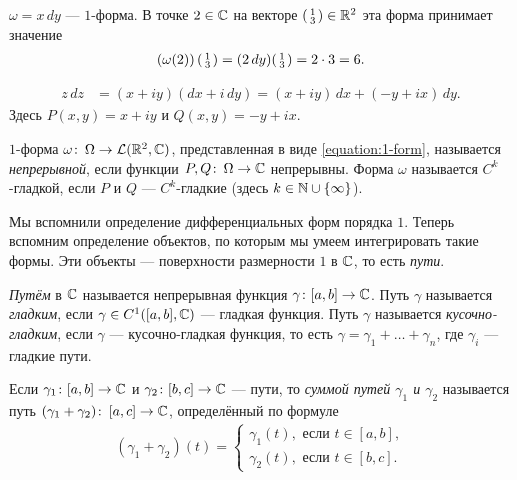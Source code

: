 \begin{exmpl*}
 $\omega = x \, dy$ --- $1$-форма. В точке $2 \in \mathbb{C}$ на векторе $ \begin{psmallmatrix}
  1 \\ 3
 \end{psmallmatrix} \in \mathbb{R}^{2}$ эта форма принимает значение
 \begin{align*}
  \left(\omega (2)\right) \begin{psmallmatrix}
   1 \\ 3
   \end{psmallmatrix}= (2 \, dy) \begin{psmallmatrix}
   1 \\ 3
  \end{psmallmatrix} = 2 \cdot 3 = 6
 .\end{align*} 
\end{exmpl*}
\begin{exmpl*}
 \begin{align*}
  z\,dz &= (x + iy)(dx + i\,dy) = (x + iy)\,dx + (-y +ix)\,dy
 .\end{align*} Здесь $P(x,y) = x + iy$ и $Q(x,y) = -y + ix$.
\end{exmpl*}
\begin{df*}
 $1$-форма $\omega \colon\, \Omega \to \mathcal{L}(\mathbb{R}^2, \mathbb{C})$, представленная в виде \eqref{equation:1-form}, называется \textit{непрерывной}, если функции $P,Q \colon\, \Omega \to \mathbb{C}$ непрерывны. Форма $\omega$ называется $C^{k}$-гладкой, если $P$ и $Q$ --- $C^{k}$-гладкие (здесь $k \in \mathbb{N} \cup \left\{ \infty \right\}$).
\end{df*}

Мы вспомнили определение дифференциальных форм порядка $1$. Теперь вспомним определение объектов, по которым мы умеем интегрировать такие формы. Эти объекты --- поверхности размерности $1$ в $\mathbb{C}$, то есть \textit{пути}.

\begin{df*}
 \textit{Путём} в $\mathbb{C}$ называется непрерывная функция $\gamma \colon [a,b] \to \mathbb{C}$. Путь $\gamma$ называется \textit{гладким}, если $\gamma \in C^{1}([a,b],\mathbb{C})$ --- гладкая функция. Путь $\gamma$ называется \textit{кусочно-гладким}, если $\gamma$ --- кусочно-гладкая функция, то есть $\gamma = \gamma_1 + \ldots + \gamma_n$, где $\gamma_i$ --- гладкие пути.
\end{df*}

\begin{df*}
 Если $\gamma_1 \colon [a,b] \to \mathbb{C}$ и $\gamma_2 \colon [b,c] \to \mathbb{C}$ --- пути, то \textit{суммой путей $\gamma_1$ и $\gamma_2$} называется путь $(\gamma_1 + \gamma_2)\colon\, [a,c] \to \mathbb{C}$, определённый по формуле
 \begin{align*}
  (\gamma_1 + \gamma_2)(t) = \begin{cases}
   \gamma_1(t), \text{ если } t \in [a,b],  \\
   \gamma_2(t), \text{ если } t \in [b,c].
  \end{cases} 
 \end{align*} 
\end{df*}

